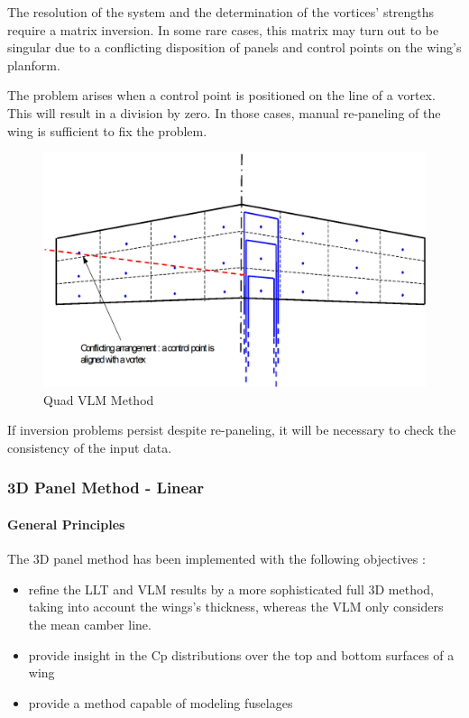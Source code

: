 \documentclass[a4paper,twoside,12pt,dvips]{article}
\begin{document}
The resolution of the system and the determination of the vortices'
strengths require a matrix inversion. In some rare cases, this matrix
may turn out to be singular due to a conflicting disposition of panels
and control points on the wing's planform.

The problem arises when a control point is positioned on the line of a
vortex. This will result in a division by zero. In those cases, manual
re-paneling of the wing is sufficient to fix the problem.

\begin{figure}[htbp]
  \includegraphics[width=0.8\linewidth]{img-20}\centering 
  \caption{Quad VLM Method}
  \label{fig:quad_vlm_method_2}
\end{figure}

If inversion problems persist despite re-paneling, it will be
necessary to check the consistency of the input data.

\subsubsection{3D Panel Method - Linear}

\paragraph{General Principles}

The 3D panel method has been implemented with the following objectives
:

\begin{itemize}
\item refine the LLT and VLM results by a more sophisticated full 3D
method, taking into account the wings's thickness, whereas the VLM
only considers the mean camber line.
\item provide insight in the Cp distributions over the top and bottom
surfaces of a wing
\item provide a method capable of modeling fuselages
\end{itemize}
\end{document}
